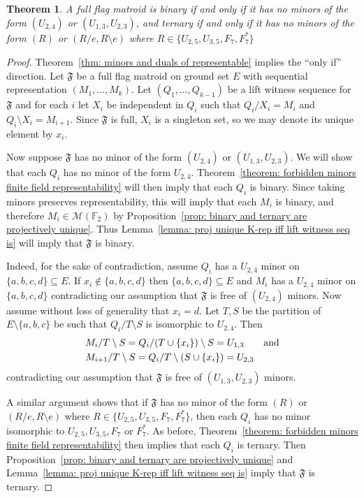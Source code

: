 \documentclass[12pt]{article}
\newtheorem{theorem}[thm]{Theorem}
\theoremstyle{definition}
\begin{document}
\begin{theorem}\label{thm: full binary forbidden minors}
    A full flag matroid is binary if and only if it has no minors of the form $(U_{2,4})$ or $(U_{1,3}, U_{2,3})$,
    and ternary if and only if it has no minors of the form $(R)$ or $(R/e, R\setminus e)$ where $R \in \{U_{2,5}, U_{3,5}, F_7, F^*_7\}$
\end{theorem}
\begin{proof}
    Theorem~\ref{thm: minors and duals of representable} implies the ``only if'' direction.
    Let $\mathfrak{F}$ be a full flag matroid on ground set $E$ with sequential representation $(M_1,\dots,M_k)$.
    Let $(Q_1,\dots,Q_{k-1})$ be a lift witness sequence for $\mathfrak{F}$
    and for each $i$ let $X_i$ be independent in $Q_i$ such that $Q_{i} / X_i =M_i$ and $Q_i \setminus X_i = M_{i+1}$.
    Since $\mathfrak{F}$ is full, $X_i$ is a singleton set, so we may denote its unique element by $x_i$.

    Now suppose $\mathfrak{F}$ has no minor of the form $(U_{2,4})$ or $(U_{1,3},U_{2,3})$.
    We will show that each $Q_i$ has no minor of the form $U_{2,4}$.
    Theorem~\ref{theorem: forbidden minors finite field representability} will then imply that each $Q_i$ is binary.
    Since taking minors preserves representability, this will imply that each $M_i$ is binary,
    and therefore $M_i \in \mathcal{M}(\mathbb{F}_2)$ by Proposition~\ref{prop: binary and ternary are projectively unique}.
    Thus Lemma~\ref{lemma: proj unique K-rep iff lift witness seq is}
    will imply that $\mathfrak{F}$ is binary.
    
    Indeed, for the sake of contradiction, assume $Q_i$ has a $U_{2,4}$ minor on $\{a,b,c,d\} \subseteq E$.
    If $x_i \notin \{a,b,c,d\}$ then $\{a,b,c,d\} \subseteq E$ and $M_i$ has a $U_{2,4}$ minor on $\{a,b,c,d\}$
    contradicting our assumption that $\mathfrak{F}$ is free of $(U_{2,4})$ minors.
    Now assume without loss of generality that $x_i = d$.
    Let $T,S$ be the partition of $E \setminus \{a,b,c\}$ be such that $Q_i / T \setminus S$ is isomorphic to $U_{2,4}$.
    Then
    \begin{align*}
        &M_i / T \setminus S = Q_i / (T \cup \{x_i\}) \setminus S = U_{1,3} \qquad {\rm and}
        \\ &M_{i+1} / T \setminus S = Q_i / T \setminus (S \cup \{x_i\}) = U_{2,3}
    \end{align*}
    contradicting our assumption that $\mathfrak{F}$ is free of $(U_{1,3},U_{2,3})$ minors.
    
    A similar argument shows that if $\mathfrak{F}$ has no minor of the form $(R)$ or $(R/e, R\setminus e)$ where $R \in \{U_{2,5}, U_{3,5}, F_7, F^*_7\}$,
    then each $Q_i$ has no minor isomorphic to $U_{2,5}, U_{3,5}, F_7$ or $F^*_7$.
    As before, Theorem~\ref{theorem: forbidden minors finite field representability} then implies that each $Q_i$ is ternary.
    Then Proposition~\ref{prop: binary and ternary are projectively unique} and Lemma~\ref{lemma: proj unique K-rep iff lift witness seq is}
    imply that $\mathfrak{F}$ is ternary.
\end{proof}
\end{document}
